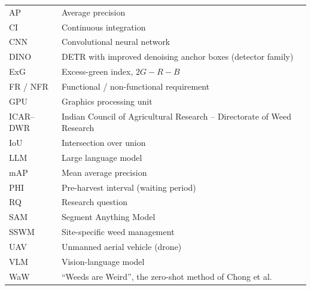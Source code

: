 \begin{tabular}{@{}L{3cm}L{11cm}@{}}
AP & Average precision\\
CI & Continuous integration\\
CNN & Convolutional neural network\\
DINO & DETR with improved denoising anchor boxes (detector family)\\
ExG & Excess-green index, $2G - R - B$\\
FR / NFR & Functional / non-functional requirement\\
GPU & Graphics processing unit\\
ICAR--DWR & Indian Council of Agricultural Research -- Directorate of Weed Research\\
IoU & Intersection over union\\
LLM & Large language model\\
mAP & Mean average precision\\
PHI & Pre-harvest interval (waiting period)\\
RQ & Research question\\
SAM & Segment Anything Model\\
SSWM & Site-specific weed management\\
UAV & Unmanned aerial vehicle (drone)\\
VLM & Vision-language model\\
WaW & ``Weeds are Weird'', the zero-shot method of Chong et al.~\cite{chong2025zeroshot}\\
\end{tabular}
\clearpage
